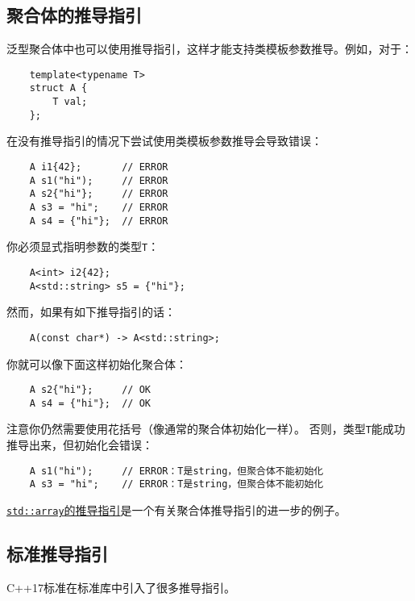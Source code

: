 \subsection{聚合体的推导指引}
泛型聚合体中也可以使用推导指引，这样才能支持类模板参数推导。例如，对于：
\begin{lstlisting}
    template<typename T>
    struct A {
        T val;
    };
\end{lstlisting}
在没有推导指引的情况下尝试使用类模板参数推导会导致错误：
\begin{lstlisting}
    A i1{42};       // ERROR
    A s1("hi");     // ERROR
    A s2{"hi"};     // ERROR
    A s3 = "hi";    // ERROR
    A s4 = {"hi"};  // ERROR
\end{lstlisting}
你必须显式指明参数的类型\texttt{T}：
\begin{lstlisting}
    A<int> i2{42};
    A<std::string> s5 = {"hi"};
\end{lstlisting}
然而，如果有如下推导指引的话：
\begin{lstlisting}
    A(const char*) -> A<std::string>;
\end{lstlisting}
你就可以像下面这样初始化聚合体：
\begin{lstlisting}
    A s2{"hi"};     // OK
    A s4 = {"hi"};  // OK
\end{lstlisting}
注意你仍然需要使用花括号（像通常的聚合体初始化一样）。
否则，类型\texttt{T}能成功推导出来，但初始化会错误：
\begin{lstlisting}
    A s1("hi");     // ERROR：T是string，但聚合体不能初始化
    A s3 = "hi";    // ERROR：T是string，但聚合体不能初始化
\end{lstlisting}
\hyperref[ch9.2.6.3]{\texttt{std::array}的推导指引}是一个有关聚合体推导指引的进一步的例子。

\subsection{标准推导指引}
C++17标准在标准库中引入了很多推导指引。

